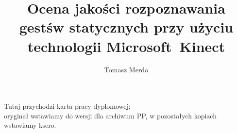 \documentclass[polish,a4paper,oneside]{ppfcmthesis}
\author{Tomasz Merda}                              %
\title{Ocena jakości rozpoznawania gestśw statycznych przy użyciu technologii
Microsoft~Kinect}                   %
\begin{document}
\frontmatter\pagestyle{empty}%
\maketitle\cleardoublepage%

\thispagestyle{empty}\vspace*{\fill}%
\begin{center}Tutaj przychodzi karta pracy dyplomowej;\\oryginał wstawiamy do wersji dla archiwum PP, w pozostałych kopiach wstawiamy ksero.\end{center}%
\vfill\cleardoublepage%

\pagestyle{ppfcmthesis}%
\tableofcontents* \cleardoublepage%

\mainmatter%





\cleardoublepage\appendix%



{\raggedright\sloppy\small}

\ppcolophon
\end{document}
